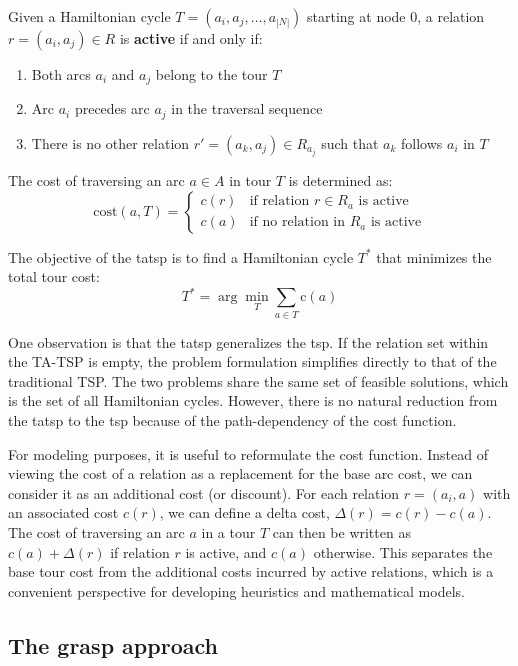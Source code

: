 \documentclass[twocolumn, switch]{article} %
\begin{document}
Given a Hamiltonian cycle $T = (a_i, a_j, \ldots, a_{|N|})$ starting at node $0$, a relation $r = (a_i, a_j) \in R$ is \textbf{active} if and only if:
\begin{enumerate}
\item Both arcs $a_i$ and $a_j$ belong to the tour $T$
\item Arc $a_i$ precedes arc $a_j$ in the traversal sequence
\item There is no other relation $r' = (a_k, a_j) \in R_{a_j}$ such that $a_k$ follows $a_i$ in $T$
\end{enumerate}

The cost of traversing an arc $a \in A$ in tour $T$ is determined as:
\begin{equation}
\text{cost}(a, T) = \begin{cases}
c(r) & \text{if relation } r \in R_a \text{ is active} \\
c(a) & \text{if no relation in } R_a \text{ is active}
\end{cases}
\end{equation}

The objective of the \gls{tatsp} is to find a Hamiltonian cycle $T^*$ that minimizes the total tour cost:
\begin{equation}
T^* = \arg\min_{T} \sum_{a \in T} \text{c}(a)
\end{equation}

One observation is that the \gls{tatsp} generalizes the \gls{tsp}. If the relation set within the TA-TSP is empty, 
the problem formulation simplifies directly to that of the traditional TSP.
The two problems share the same set of feasible solutions, which is the set of all Hamiltonian cycles.
However, there is no natural reduction from the \gls{tatsp} to the \gls{tsp} because of the path-dependency of the cost function.

For modeling purposes, it is useful to reformulate the cost function. Instead of viewing the cost of a relation as a replacement for the base arc cost, we can consider it as an additional cost (or discount). For each relation $r = (a_i, a)$ with an associated cost $c(r)$, we can define a delta cost, $\Delta(r) = c(r) - c(a)$. The cost of traversing an arc $a$ in a tour $T$ can then be written as $c(a) + \Delta(r)$ if relation $r$ is active, and $c(a)$ otherwise. This separates the base tour cost from the additional costs incurred by active relations, which is a convenient perspective for developing heuristics and mathematical models.

\subsection{The \gls{grasp} approach}
\end{document}
